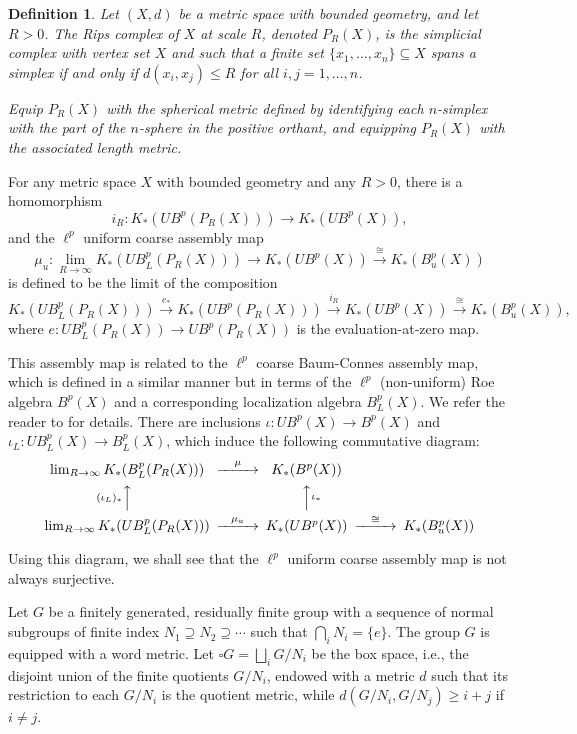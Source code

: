 \documentclass[a4,11pt]{amsart}
\newtheorem{defn}[thm]{Definition}
\theoremstyle{remark}
\begin{document}
\begin{defn}
Let $(X,d)$ be a metric space with bounded geometry, and let $R>0$. The Rips complex of $X$ at scale $R$, denoted $P_R(X)$, is the simplicial complex with vertex set $X$ and such that a finite set $\{x_1,\ldots,x_n\}\subseteq X$ spans a simplex if and only if $d(x_i,x_j)\leq R$ for all $i,j=1,\ldots,n$.

Equip $P_R(X)$ with the spherical metric defined by identifying each $n$-simplex with the part of the $n$-sphere in the positive orthant, and equipping $P_R(X)$ with the associated length metric.
\end{defn}

For any metric space $X$ with bounded geometry and any $R>0$, there is a homomorphism 
\[ i_R:K_*(UB^p(P_R(X)))\rightarrow K_*(UB^p(X)), \] 
and the $\ell^p$ uniform coarse assembly map
\[ \mu_u:\lim_{R\rightarrow\infty}K_*(UB^p_L(P_R(X)))\rightarrow K_*(UB^p(X)) \stackrel{\cong}{\rightarrow} K_*(B^p_u(X)) \]
is defined to be the limit of the composition
\[ K_*(UB^p_L(P_R(X)))\stackrel{e_*}{\rightarrow} K_*(UB^p(P_R(X)))\stackrel{i_R}{\rightarrow} K_*(UB^p(X))\stackrel{\cong}{\rightarrow} K_*(B^p_u(X)), \]
where $e:UB^p_L(P_R(X))\rightarrow UB^p(P_R(X))$ is the evaluation-at-zero map.

This assembly map is related to the $\ell^p$ coarse Baum-Connes assembly map, which is defined in a similar manner but in terms of the $\ell^p$ (non-uniform) Roe algebra $B^p(X)$ and a corresponding localization algebra $B^p_L(X)$.
We refer the reader to \cite[Section 2.1]{Chung23} for details.
There are inclusions $\iota:UB^p(X)\rightarrow B^p(X)$ and $\iota_L:UB^p_L(X)\rightarrow B^p_L(X)$, which induce the following commutative diagram:
\[
\begin{CD}
\lim_{R\rightarrow\infty}K_*(B^p_L(P_R(X)))	@>\mu>>	K_*(B^p(X)) \\
@A(\iota_L)_*AA  @AA\iota_*A \\
\lim_{R\rightarrow\infty}K_*(UB^p_L(P_R(X)))	@>\mu_u>>	K_*(UB^p(X)) @>\cong>> K_*(B^p_u(X))
\end{CD}
\]

Using this diagram, we shall see that the $\ell^p$ uniform coarse assembly map is not always surjective.

Let $G$ be a finitely generated, residually finite group with a sequence of normal subgroups of finite index $N_1\supseteq N_2\supseteq \cdots$ such that $\bigcap_i N_i=\{e\}$. The group $G$ is equipped with a word metric. Let $\square G=\bigsqcup_i G/N_i$ be the box space, i.e., the disjoint union of the finite quotients $G/N_i$, endowed with a metric $d$ such that its restriction to each $G/N_i$ is the quotient metric, while $d(G/N_i,G/N_j)\geq i+j$ if $i\neq j$.
\end{document}
